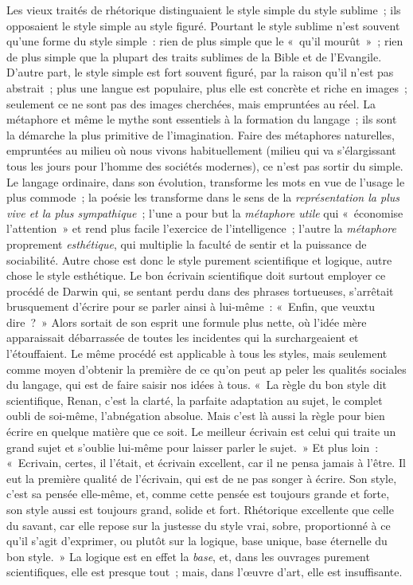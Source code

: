 \documentclass[french,twoside]{book} %
\begin{document}
Les vieux traités de rhétorique distinguaient le style simple du style sublime ; ils opposaient le style simple au style figuré. Pourtant le style sublime n’est souvent qu’une forme du style simple : rien de plus simple que le « qu’il mourût » ; rien de plus simple que la plupart des traits sublimes de la Bible et de l’Evangile. D’autre part, le style simple est fort souvent figuré, par la raison qu’il n’est pas abstrait ; plus une langue est populaire, plus elle est concrète et riche en images ; seulement ce ne sont pas des images cherchées, mais empruntées au réel. La métaphore et même le mythe sont essentiels à la formation du langage ; ils sont la démarche la plus primitive de l’imagination. Faire des métaphores naturelles, empruntées au milieu où nous vivons habituellement (milieu qui va s’élargissant tous les jours pour l’homme des sociétés modernes), ce n’est pas sortir du simple. Le langage ordinaire, dans son évolution, transforme les mots en vue de l’usage le plus commode ; la poésie les transforme dans le sens de la \emph{représentation la plus vive et la plus sympathique} ; l’une a pour but la \emph{métaphore utile} qui « économise l’attention » et rend plus facile l’exercice de l’intelligence ; l’autre la \emph{métaphore} proprement \emph{esthétique}, qui multiplie la faculté de sentir et la puissance de sociabilité. Autre chose est donc le style purement scientifique et logique, autre chose le style esthétique. Le bon écrivain scientifique doit surtout employer ce procédé de Darwin qui, se sentant perdu dans des phrases tortueuses, s’arrêtait brusquement d’écrire pour se parler ainsi à lui-même : « Enfin, que veuxtu dire ? » Alors sortait de son esprit une formule plus nette, où l’idée mère apparaissait débarrassée de toutes les incidentes qui la surchargeaient et l’étouffaient. Le même procédé est applicable à tous les styles, mais seulement comme moyen d’obtenir la première de ce qu’on peut ap peler les qualités sociales du langage, qui est de faire saisir nos idées à tous. « La règle du bon style dit scientifique, Renan, c’est la clarté, la parfaite adaptation au sujet, le complet oubli de soi-même, l’abnégation absolue. Mais c’est là aussi la règle pour bien écrire en quelque matière que ce soit. Le meilleur écrivain est celui qui traite un grand sujet et s’oublie lui-même pour laisser parler le sujet. » Et plus loin : « Ecrivain, certes, il l’était, et écrivain excellent, car il ne pensa jamais à l’être. Il eut la première qualité de l’écrivain, qui est de ne pas songer à écrire. Son style, c’est sa pensée elle-même, et, comme cette pensée est toujours grande et forte, son style aussi est toujours grand, solide et fort. Rhétorique excellente que celle du savant, car elle repose sur la justesse du style vrai, sobre, proportionné à ce qu’il s’agit d’exprimer, ou plutôt sur la logique, base unique, base éternelle du bon style. » La logique est en effet la \emph{base}, et, dans les ouvrages purement scientifiques, elle est presque tout ; mais, dans l’œuvre d’art, elle est insuffisante.\par
\end{document}
